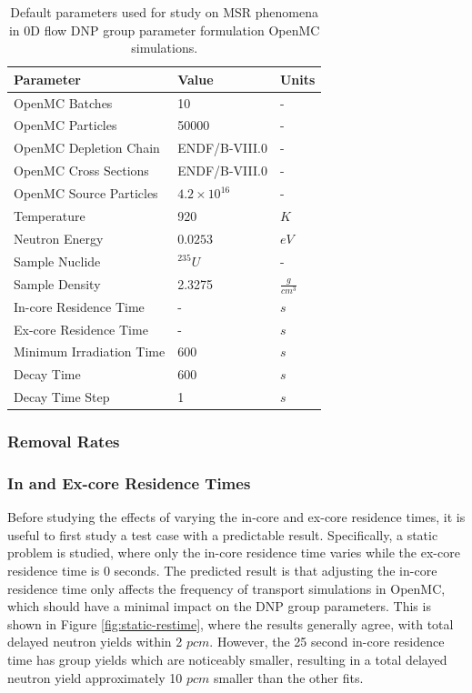 \begin{table}[H]
    \centering
    \begin{tabular}{lll}
        \hline
       Parameter  & Value & Units \\
       \hline
        OpenMC Batches & 10 & - \\
        OpenMC Particles & 50000 & - \\
        OpenMC Depletion Chain & ENDF/B-VIII.0 & - \\
        OpenMC Cross Sections & ENDF/B-VIII.0 & - \\
        OpenMC Source Particles & $4.2\times 10^{16}$ & -\\
        Temperature & 920 & $K$\\
        Neutron Energy & $0.0253$ & $eV$\\
        Sample Nuclide & $^{235}U$ & -\\
        Sample Density & 2.3275 & $\frac{g}{cm^3}$\\
        In-core Residence Time & - & $s$\\
        Ex-core Residence Time & - & $s$\\
        Minimum Irradiation Time & 600 & $s$\\
        Decay Time & 600 & $s$\\
        Decay Time Step & 1 & $s$\\
        \hline
    \end{tabular}
    \caption{Default parameters used for study on \gls{MSR} phenomena in 0D flow \gls{DNP} group parameter formulation OpenMC simulations.}
    \label{tab:params-msr}
\end{table}

\subsubsection{Removal Rates}
\label{sec:repr-scale}

\subsubsection{In and Ex-core Residence Times}
\label{sec:res-time-var}
Before studying the effects of varying the in-core and ex-core residence times, it is useful to first study a test case with a predictable result.
Specifically, a static problem is studied, where only the in-core residence time varies while the ex-core residence time is 0 seconds.
The predicted result is that adjusting the in-core residence time only affects the frequency of transport simulations in OpenMC, which should have a minimal impact on the \gls{DNP} group parameters.
This is shown in Figure \ref{fig:static-restime}, where the results generally agree, with total delayed neutron yields within 2 $pcm$.
However, the 25 second in-core residence time has group yields which are noticeably smaller, resulting in a total delayed neutron yield approximately 10 $pcm$ smaller than the other fits.

